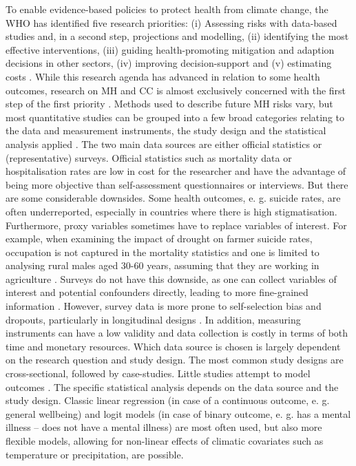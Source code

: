 \documentclass[
]{krantz}
\begin{document}
To enable evidence-based policies to protect health from climate change, the WHO has identified five research priorities: (i) Assessing risks with data-based studies and, in a second step, projections and modelling, (ii) identifying the most effective interventions, (iii) guiding health-promoting mitigation and adaption decisions in other sectors, (iv) improving decision-support and (v) estimating costs \citep{worldhealthorganizationProtectingHealthClimate2009}.
While this research agenda has advanced in relation to some health outcomes, research on MH and CC is almost exclusively concerned with the first step of the first priority \citep{cianconiImpactClimateChange2020}. Methods used to describe future MH risks vary, but most quantitative studies can be grouped into a few broad categories relating to the data and measurement instruments, the study design and the statistical analysis applied \citep{charlsonClimateChangeMental2021}. The two main data sources are either official statistics or (representative) surveys. Official statistics such as mortality data or hospitalisation rates are low in cost for the researcher and have the advantage of being more objective than self-assessment questionnaires or interviews. But there are some considerable downsides. Some health outcomes, e. g. suicide rates, are often underreported, especially in countries where there is high stigmatisation. Furthermore, proxy variables sometimes have to replace variables of interest. For example, when examining the impact of drought on farmer suicide rates, occupation is not captured in the mortality statistics and one is limited to analysing rural males aged 30-60 years, assuming that they are working in agriculture \citep{carletonCropdamagingTemperaturesIncrease2017}. Surveys do not have this downside, as one can collect variables of interest and potential confounders directly, leading to more fine-grained information \citep{edwardsImpactDroughtMental2015}. However, survey data is more prone to self-selection bias and dropouts, particularly in longitudinal designs \citep{kesslerTrendsMentalIllness2008}. In addition, measuring instruments can have a low validity and data collection is costly in terms of both time and monetary resources. Which data source is chosen is largely dependent on the research question and study design.
The most common study designs are cross-sectional, followed by case-studies. Little studies attempt to model outcomes \citep{charlsonClimateChangeMental2021}.
The specific statistical analysis depends on the data source and the study design. Classic linear regression (in case of a continuous outcome, e. g. general wellbeing) and logit models (in case of binary outcome, e. g. has a mental illness -- does not have a mental illness) are most often used, but also more flexible models, allowing for non-linear effects of climatic covariates such as temperature or precipitation, are possible.
\end{document}
